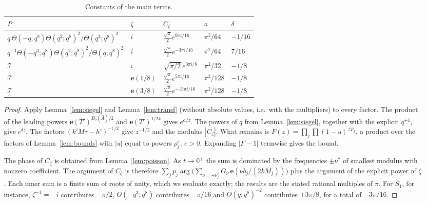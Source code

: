 \documentclass[11pt]{amsart}
\theoremstyle{definition}
\theoremstyle{remark}
\numberwithin{equation}{section}
\newcommand{\e}{\mathbf{e}}
\newcommand{\THq}{\mathcal{T}}
\newcommand{\Ahat}{\widehat{A}}
\begin{document}
\begin{table}[ht]
\centering
\renewcommand{\arraystretch}{1.25}
\begin{tabular}{@{}lllll@{}}
\toprule
$P$ & $\zeta$ & $C_\zeta$ & $a$ & $\delta$\\
\midrule
$q\,\Theta(-q;q^8)\Theta(q^2;q^8)^2/\Theta(q^3;q^8)^2$ & $i$ & $\frac{\sqrt\pi}2e^{9\pi i/16}$ & $\pi^2/64$ & $-1/16$\\
$q^{-1}\Theta(-q^3;q^8)\Theta(q^2;q^8)^2/\Theta(q;q^8)^2$ & $i$ & $\frac{\sqrt\pi}2e^{-3\pi i/16}$ & $\pi^2/64$ & $7/16$\\
$\THq$ & $i$ & $\sqrt{\pi/2}\,e^{3\pi i/8}$ & $\pi^2/32$ & $-1/8$\\
$\THq$ & $\e(1/8)$ & $\frac{\sqrt\pi}2e^{5\pi i/16}$ & $\pi^2/128$ & $-1/8$\\
$\THq$ & $\e(3/8)$ & $\frac{\sqrt\pi}2e^{-13\pi i/16}$ & $\pi^2/128$ & $-1/8$\\
\bottomrule
\end{tabular}
\caption{Constants of the main terms.}\label{tab:const}
\end{table}

\begin{proof}
Apply Lemma~\ref{lem:siegel} and Lemma~\ref{lem:transf} (without absolute values, i.e.\ with the multipliers) to every factor.
The product of the leading powers $\e(T')^{B_2(\Ahat)/2}$ and $\e(T')^{1/24}$ gives $e^{a/z}$.
The powers of $q$ from Lemma~\ref{lem:siegel}, together with the explicit $q^{\pm1}$, give $e^{\delta z}$.
The factors $(k'M\tau-h')^{-1/2}$ give $z^{-1/2}$ and the modulus $|C_\zeta|$.
What remains is $F(z)=\prod_j\prod(1-u)^{\pm p_j}$, a product over the factors of Lemma~\ref{lem:bounds} with $|u|$ equal to powers $\rho_j^{e}$, $e>0$.
Expanding $|F-1|$ termwise gives the bound.

The phase of $C_\zeta$ is obtained from Lemma~\ref{lem:poisson}.
As $t\to0^+$ the sum is dominated by the frequencies $\pm\nu^*$ of smallest modulus with nonzero coefficient.
The argument of $C_\zeta$ is therefore $\sum_jp_j\arg\big(\sum_{\nu=\pm\nu^*_j}G_\nu\,\e(\nu b_j/(2kM_j))\big)$ plus the argument of the explicit power of $\zeta$.
Each inner sum is a finite sum of roots of unity, which we evaluate exactly; the results are the stated rational multiples of $\pi$.
For $S_1$, for instance, $\zeta^{-1}=-i$ contributes $-\pi/2$, $\Theta(-q^3;q^8)$ contributes $-\pi/16$ and $\Theta(q;q^8)^{-2}$ contributes $+3\pi/8$, for a total of $-3\pi/16$.
\end{proof}
\end{document}
